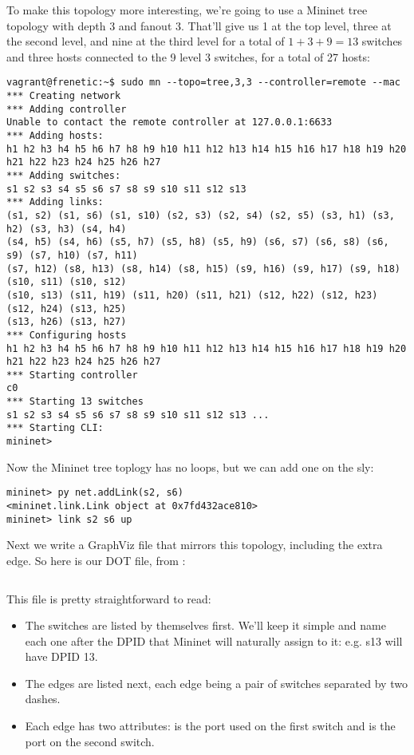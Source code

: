 To make this topology more interesting, we're going to use a Mininet tree topology with depth 3 and fanout 3.
That'll give us 1 at the top level, three at the second level, and nine at the third level
for a total of $1 + 3 + 9 = 13$ switches and three hosts connected to the 9 level 3 switches, for a total of 27
hosts:

\begin{verbatim}
vagrant@frenetic:~$ sudo mn --topo=tree,3,3 --controller=remote --mac
*** Creating network
*** Adding controller
Unable to contact the remote controller at 127.0.0.1:6633
*** Adding hosts:
h1 h2 h3 h4 h5 h6 h7 h8 h9 h10 h11 h12 h13 h14 h15 h16 h17 h18 h19 h20 h21 h22 h23 h24 h25 h26 h27
*** Adding switches:
s1 s2 s3 s4 s5 s6 s7 s8 s9 s10 s11 s12 s13
*** Adding links:
(s1, s2) (s1, s6) (s1, s10) (s2, s3) (s2, s4) (s2, s5) (s3, h1) (s3, h2) (s3, h3) (s4, h4) 
(s4, h5) (s4, h6) (s5, h7) (s5, h8) (s5, h9) (s6, s7) (s6, s8) (s6, s9) (s7, h10) (s7, h11) 
(s7, h12) (s8, h13) (s8, h14) (s8, h15) (s9, h16) (s9, h17) (s9, h18) (s10, s11) (s10, s12) 
(s10, s13) (s11, h19) (s11, h20) (s11, h21) (s12, h22) (s12, h23) (s12, h24) (s13, h25) 
(s13, h26) (s13, h27)
*** Configuring hosts
h1 h2 h3 h4 h5 h6 h7 h8 h9 h10 h11 h12 h13 h14 h15 h16 h17 h18 h19 h20 h21 h22 h23 h24 h25 h26 h27
*** Starting controller
c0
*** Starting 13 switches
s1 s2 s3 s4 s5 s6 s7 s8 s9 s10 s11 s12 s13 ...
*** Starting CLI:
mininet>
\end{verbatim} 

Now the Mininet tree toplogy has no loops, but we can add one on the sly:

\begin{verbatim}
mininet> py net.addLink(s2, s6) 
<mininet.link.Link object at 0x7fd432ace810>
mininet> link s2 s6 up
\end{verbatim}

Next we write a GraphViz file that mirrors this topology, including the extra edge.  
So here is our DOT file, from :

\inputminted{python}{code/multiswitch_topologies/multiswitch_topo.dot}

This file is pretty straightforward to read:

\begin{itemize}
\item The switches are listed by themselves first.  We'll keep it simple and name each one after the DPID that
Mininet will naturally assign to it: e.g. s13 will have DPID 13.
\item The edges are listed next, each edge being a pair of switches separated by two dashes.
\item Each edge has two attributes:  is the port used on the first switch and 
is the port on the second switch.  
\end{itemize}

